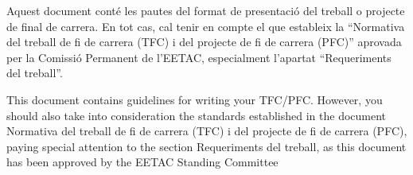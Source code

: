 \documentclass[english,final]{setup/eetac_tfc_pfc}
\begin{document}

\beforepreface  


\begin{resum}{10cm}
  Aquest document conté les pautes del format de presentació del treball o projecte de final de carrera. En tot cas, cal tenir en compte el que estableix la ``Normativa del treball de fi de carrera (TFC) i del projecte de fi de carrera (PFC)'' aprovada per la Comissió Permanent de l'EETAC, especialment l'apartat ``Requeriments del treball''.
\end{resum}

\begin{overview}{11cm}
  This document contains guidelines for writing your TFC/PFC. However, you should also take into consideration the standards established in the document Normativa del treball de fi de carrera (TFC) i del projecte de fi de carrera (PFC), paying special attention to the section Requeriments del treball, as this document has been approved by the EETAC Standing Committee
\end{overview}





\afterpreface



\end{document}

